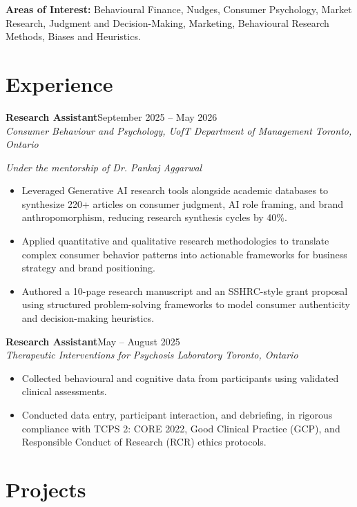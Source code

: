 \documentclass[10pt]{article}
\newcommand{\role}[4]{%
  \noindent\textbf{#1}\hfill{\small\color{graytext}#4}\\
  {\itshape\small #2 \hfill #3}\par\vspace{2pt}
}
\begin{document}
\vspace{2pt}
\textbf{\small Areas of Interest:} \small Behavioural Finance, Nudges, Consumer Psychology, Market Research, Judgment and Decision-Making, Marketing, Behavioural Research Methods, Biases and Heuristics.\normalsize

\section*{Experience}

\role{Research Assistant}{Consumer Behaviour and Psychology, UofT Department of Management}{Toronto, Ontario}{September 2025 -- May 2026}
{\small\itshape Under the mentorship of Dr. Pankaj Aggarwal}\vspace{2pt}
\begin{itemize}
  \item Leveraged Generative AI research tools alongside academic databases to synthesize 220+ articles on consumer judgment, AI role framing, and brand anthropomorphism, reducing research synthesis cycles by 40\%.
  \item Applied quantitative and qualitative research methodologies to translate complex consumer behavior patterns into actionable frameworks for business strategy and brand positioning.
  \item Authored a 10-page research manuscript and an SSHRC-style grant proposal using structured problem-solving frameworks to model consumer authenticity and decision-making heuristics.
\end{itemize}

\vspace{2pt}
\role{Research Assistant}{Therapeutic Interventions for Psychosis Laboratory}{Toronto, Ontario}{May -- August 2025}
\begin{itemize}
  \item Collected behavioural and cognitive data from participants using validated clinical assessments.
  \item Conducted data entry, participant interaction, and debriefing, in rigorous compliance with TCPS 2: CORE 2022, Good Clinical Practice (GCP), and Responsible Conduct of Research (RCR) ethics protocols.
\end{itemize}

\section*{Projects}
\end{document}

